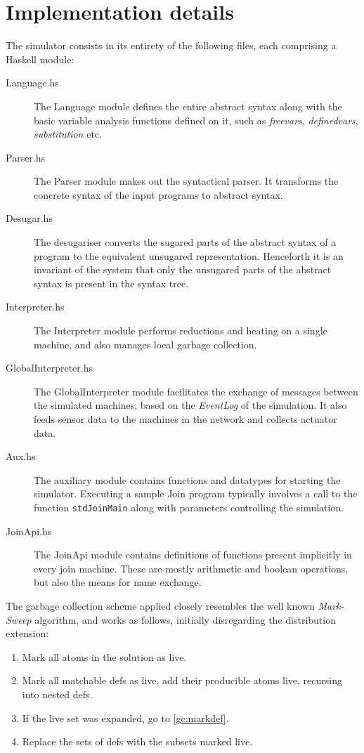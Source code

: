 \section{Implementation details}
The simulator consists in its entirety of the following files, each comprising a
Haskell module:
\begin{description}

\item[Language.hs] The Language module defines the entire abstract syntax along
with the basic variable analysis functions defined on it, such as
\emph{freevars}, \emph{definedvars}, \emph{substitution} etc.

\item[Parser.hs] The Parser module makes out the syntactical parser. It
transforms the concrete syntax of the input programs to abstract syntax.

\item[Desugar.hs] The desugariser converts the sugared parts of the abstract
syntax of a program to the equivalent unsugared representation. Henceforth it is
an invariant of the system that only the unsugared parts of the abstract syntax
is present in the syntax tree.

\item[Interpreter.hs] The Interpreter module performs reductions and heating on
a single machine, and also manages local garbage collection.

\item[GlobalInterpreter.hs] The GlobalInterpreter module facilitates the
exchange of messages between the simulated machines, based on the
\emph{EventLog} of the simulation. It also feeds sensor data to the machines in
the network and collects actuator data.

\item[Aux.hs] The auxiliary module contains functions and datatypes for starting
the simulator. Executing a sample Join program typically involves a call to the
function \texttt{stdJoinMain} along with parameters controlling the simulation.

\item[JoinApi.hs] The JoinApi module contains definitions of functions present
implicitly in every join machine. These are mostly arithmetic and boolean
operations, but also the means for name exchange.

\end{description}

The garbage collection scheme applied closely resembles the well known
\emph{Mark-Sweep} algorithm, and works as follows, initially disregarding the
distribution extension:
\begin{enumerate}
\item Mark all atoms in the solution as live.
\item Mark all matchable defs as live, add their producible atoms live,
recursing into nested defs.\label{gc:markdef}
\item If the live set was expanded, go to \ref{gc:markdef}.
\item Replace the sets of defs with the subsets marked live.
\end{enumerate}

